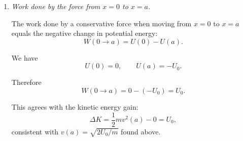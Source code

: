 \documentclass[12pt]{article}
\begin{document}
\begin{enumerate}
\begin{enumerate}
    Initially ($x=0$): released from rest $\Rightarrow v=0$,
    \[
    E = K_i + U_i = 0 + U(0) = U(0) = 0.
    \]

    At $x=a$:
    \[
    E = K_f + U(a)
    = \frac{1}{2} m v^2(a) + U(a).
    \]

    Conservation $E_i=E_f$:
    \[
    0
    = \frac{1}{2} m v^2(a) + U(a).
    \]

    We already have
    \[
    U(a) = -U_0.
    \]

    So
    \[
    0
    = \frac{1}{2} m v^2(a) - U_0
    \quad\Longrightarrow\quad
    \frac{1}{2} m v^2(a) = U_0.
    \]

    Solve for $v(a)$:
    \[
    v(a) = \sqrt{\frac{2U_0}{m}}.
    \]

    Note: the particle moves from an unstable equilibrium at $x=0$ down to a stable equilibrium at $x=a$, losing potential energy (from $0$ to $-U_0$) and gaining kinetic energy.

    \item \textit{Work done by the force from $x=0$ to $x=a$.}

    The work done by a conservative force when moving from $x=0$ to $x=a$ equals the negative change in potential energy:
    \[
    W(0 \to a) = U(0) - U(a).
    \]

    We have
    \[
    U(0) = 0,
    \qquad
    U(a) = -U_0.
    \]

    Therefore
    \[
    W(0 \to a)
    = 0 - (-U_0)
    = U_0.
    \]

    This agrees with the kinetic energy gain:
    \[
    \Delta K = \frac{1}{2}m v^2(a) - 0 = U_0,
    \]
    consistent with $v(a)=\sqrt{2U_0/m}$ found above.
\end{enumerate}

\end{enumerate}
\end{document}
